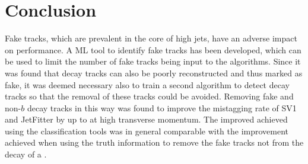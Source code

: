 


\section{Conclusion}\label{sec:fake_track_mva_conclusion}

Fake tracks, which are prevalent in the core of high \pt jets, have an adverse impact on \btagging performance.
A ML tool to identify fake tracks has been developed, which can be used to limit the number of fake tracks being input to the \btagging algorithms.
Since it was found that \bhadron decay tracks can also be poorly reconstructed and thus marked as fake, it was deemed necessary also to train a second algorithm to detect \bhadron decay tracks so that the removal of these tracks could be avoided.
Removing fake and non-$b$ decay tracks in this way was found to improve the \ljet mistagging rate of SV1 and JetFitter by up to  at high transverse momentum.
The improved achieved using the classification tools was in general comparable with the improvement achieved when using the truth information to remove the fake tracks not from the decay of a \bhadron.

